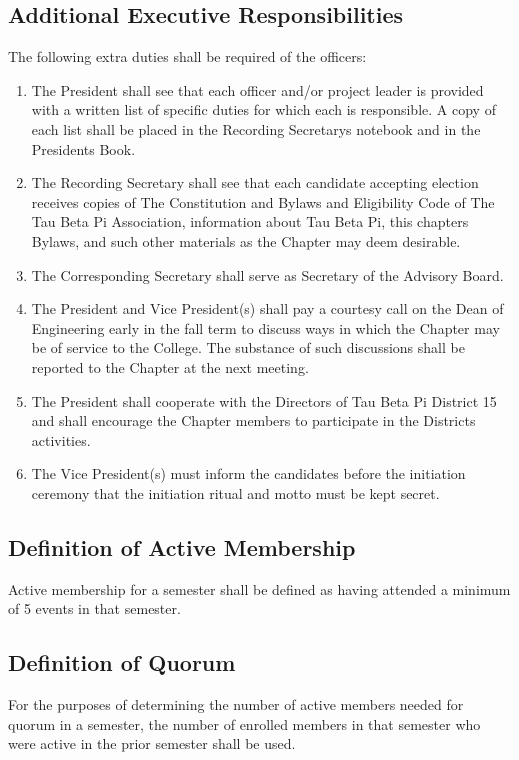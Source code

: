 \documentclass{article}
\begin{document}
	\subsection{Additional Executive Responsibilities}
	The following extra duties shall be required of the officers:
	\begin{enumerate}[\indent (a)]
		\item The President shall see that each officer and/or project leader is provided with a written list of specific duties for which each is responsible. A copy of each list shall be placed in the Recording Secretary\textquotesingle s notebook and in the President\textquotesingle s Book.
		\item The Recording Secretary shall see that each candidate accepting election receives copies of The Constitution and Bylaws and Eligibility Code of The Tau Beta Pi Association, information about Tau Beta Pi, this chapter\textquotesingle s Bylaws, and such other materials as the Chapter may deem desirable.
		\item The Corresponding Secretary shall serve as Secretary of the Advisory Board.
		\item The President and Vice President(s) shall pay a courtesy call on the Dean of Engineering early in the fall term to discuss ways in which the Chapter may be of service to the College. The substance of such discussions shall be reported to the Chapter at the next meeting.
		\item The President shall cooperate with the Directors of Tau Beta Pi District 15 and shall encourage the Chapter members to participate in the District\textquotesingle s activities.
		\item The Vice President(s) must inform the candidates before the initiation ceremony that the initiation ritual and motto must be kept secret.
	\end{enumerate}
	\subsection{Definition of Active Membership}
	Active membership for a semester shall be defined as having attended a minimum of 5 events in that semester.
	\subsection{Definition of Quorum}
	For the purposes of determining the number of active members needed for quorum in a semester, the number of enrolled members in that semester who were active in the prior semester shall be used.
\end{document}
